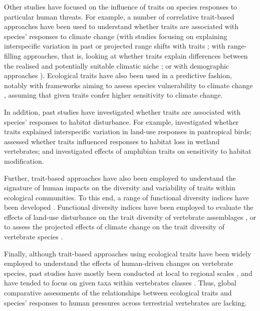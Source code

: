 Other studies have focused on the influence of traits on species responses to particular human threats. For example, a number of correlative trait-based approaches have been used to understand whether traits are associated with species' responses to climate change (with studies focusing on explaining interspecific variation in past or projected range shifts with traits \citep{Schloss2012a, Mccain2014a, Pacifici2017, DiMarco2021}; with range-filling approaches, that is, looking at whether traits explain differences between the realised and potentially suitable climatic niche \citep{Estrada2018}; or with demographic approaches \citep{Spooner2018, Capdevila2022}). Ecological traits have also been used in a predictive fashion, notably with frameworks aiming to assess species vulnerability to climate change \citep{Foden2013, Pacifici2015}, assuming that given traits confer higher sensitivity to climate change. 

In addition, past studies have investigated whether traits are associated with species' responses to habitat disturbance. For example, \citet{Newbold2013} investigated whether traits explained interspecific variation in land-use responses in pantropical birds; \citet{Quesnelle2014} assessed whether traits influenced responses to habitat loss in wetland vertebrates; and \citet{Nowakowski2017} investigated effects of amphibian traits on sensitivity to habitat modification.

Further, trait-based approaches have also been employed to understand the signature of human impacts on the diversity and variability of traits within ecological communities. To this end, a range of functional diversity indices have been developed \citep{Schleuter2010a, Legras2018}. Functional diversity indices have been employed to evaluate the effects of land-use disturbance on the trait diversity of vertebrate assemblages \citep{Flynn2009, LaSorte2018, Tinoco2018}, or to assess the projected effects of climate change on the trait diversity of vertebrate species \citep{Stewart2022}.

Finally, although trait-based approaches using ecological traits have been widely employed to understand the effects of human-driven changes on vertebrate species, past studies have mostly been conducted at local to regional scales \citep{Davison2021}, and have tended to focus on given taxa within vertebrates classes \citep{Hevia2017}. Thus, global comparative assessments of the relationships between ecological traits and species' responses to human pressures across terrestrial vertebrates are lacking.


